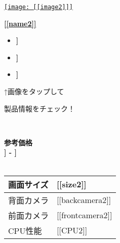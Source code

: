 \documentclass[lualatex,paper=a4,airticle]{jlreq}
\begin{document}
\vspace{1cm} %

\begin{minipage}[b][0.43\textheight][t]{\textwidth}
  \begin{minipage}{0.23\textwidth}
    \href{[[url2]]}{\texttt{[image: [[image2]]]}}
  \end{minipage}%
  \hfill
  \begin{minipage}{0.77\textwidth}
    \href{[[lurl2]]}{\huge{\textbf{[[name2]]}}}\par
    \begin{itemize}
      \item {\color{Purple}\mcfamily\bfseries\myfont [[description21]]}
      \item {\color{Purple}\mcfamily\bfseries\myfont [[description22]]}
      \item {\color{Purple}\mcfamily\bfseries\myfont [[description23]]}
    \end{itemize}
  \end{minipage}
  \vspace{-1\baselineskip}
  \begin{multicols}{2}
    \begin{spacing}{0.5}
      {\qquad↑画像をタップして \par \qquad 製品情報をチェック！}\\
    \end{spacing}
    {\color{red}\textbf{参考価格}}\\
    {\LARGE\color{red}\textbf{\textyen [[lprice2]] - \textyen [[hprice2]]}}\\
    \\
    \begin{minipage}{0.75\columnwidth}
      \begin{tabular}{l p{4.5cm}}
        \hline
        画面サイズ & [[size2]] \\
        \hline
        背面カメラ & [[backcamera2]] \\
        \hline
        前面カメラ & [[frontcamera2]] \\
        \hline
        CPU性能 & [[CPU2]] \\
        \hline
      \end{tabular}
    \end{minipage}
    \columnbreak


\end{multicols}
\end{minipage}
\end{document}
